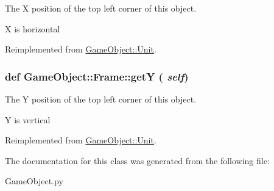 The X position of the top left corner of this object. 

X is horizontal 

Reimplemented from \hyperlink{classGameObject_1_1Unit_a01711efd87c7e3e2a97066e9a5c50da5}{GameObject::Unit}.

\hypertarget{classGameObject_1_1Frame_abf564d6f986b8e9d2a83838691c591f9}{
\subsubsection[{getY}]{\setlength{\rightskip}{0pt plus 5cm}def GameObject::Frame::getY ( {\em self})}}
\label{classGameObject_1_1Frame_abf564d6f986b8e9d2a83838691c591f9}


The Y position of the top left corner of this object. 

Y is vertical 

Reimplemented from \hyperlink{classGameObject_1_1Unit_a4d0c47deb0ddb19b9e2b195d8ca2f2ad}{GameObject::Unit}.



The documentation for this class was generated from the following file:\begin{DoxyCompactItemize}
\item 
GameObject.py\end{DoxyCompactItemize}
